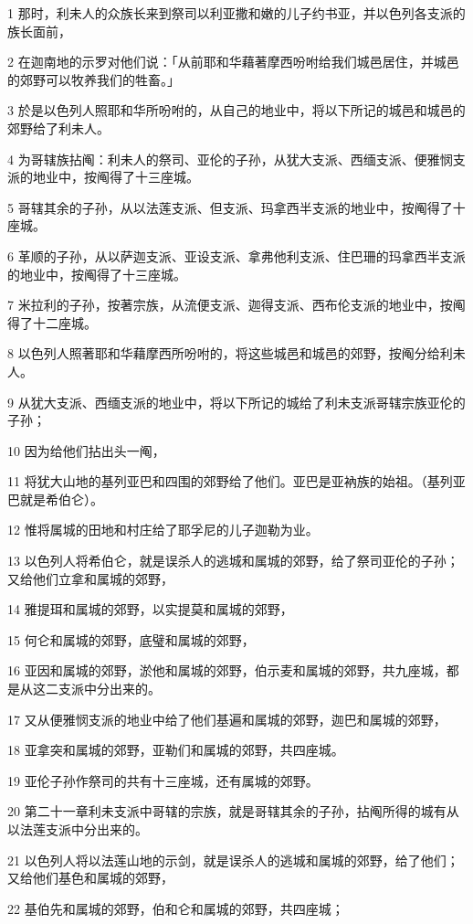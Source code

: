 \par 1 那时，利未人的众族长来到祭司以利亚撒和嫩的儿子约书亚，并以色列各支派的族长面前，
\par 2 在迦南地的示罗对他们说：「从前耶和华藉著摩西吩咐给我们城邑居住，并城邑的郊野可以牧养我们的牲畜。」
\par 3 於是以色列人照耶和华所吩咐的，从自己的地业中，将以下所记的城邑和城邑的郊野给了利未人。
\par 4 为哥辖族拈阄：利未人的祭司、亚伦的子孙，从犹大支派、西缅支派、便雅悯支派的地业中，按阄得了十三座城。
\par 5 哥辖其余的子孙，从以法莲支派、但支派、玛拿西半支派的地业中，按阄得了十座城。
\par 6 革顺的子孙，从以萨迦支派、亚设支派、拿弗他利支派、住巴珊的玛拿西半支派的地业中，按阄得了十三座城。
\par 7 米拉利的子孙，按著宗族，从流便支派、迦得支派、西布伦支派的地业中，按阄得了十二座城。
\par 8 以色列人照著耶和华藉摩西所吩咐的，将这些城邑和城邑的郊野，按阄分给利未人。
\par 9 从犹大支派、西缅支派的地业中，将以下所记的城给了利未支派哥辖宗族亚伦的子孙；
\par 10 因为给他们拈出头一阄，
\par 11 将犹大山地的基列亚巴和四围的郊野给了他们。亚巴是亚衲族的始祖。（基列亚巴就是希伯仑）。
\par 12 惟将属城的田地和村庄给了耶孚尼的儿子迦勒为业。
\par 13 以色列人将希伯仑，就是误杀人的逃城和属城的郊野，给了祭司亚伦的子孙；又给他们立拿和属城的郊野，
\par 14 雅提珥和属城的郊野，以实提莫和属城的郊野，
\par 15 何仑和属城的郊野，底璧和属城的郊野，
\par 16 亚因和属城的郊野，淤他和属城的郊野，伯示麦和属城的郊野，共九座城，都是从这二支派中分出来的。
\par 17 又从便雅悯支派的地业中给了他们基遍和属城的郊野，迦巴和属城的郊野，
\par 18 亚拿突和属城的郊野，亚勒们和属城的郊野，共四座城。
\par 19 亚伦子孙作祭司的共有十三座城，还有属城的郊野。
\par 20 第二十一章利未支派中哥辖的宗族，就是哥辖其余的子孙，拈阄所得的城有从以法莲支派中分出来的。
\par 21 以色列人将以法莲山地的示剑，就是误杀人的逃城和属城的郊野，给了他们；又给他们基色和属城的郊野，
\par 22 基伯先和属城的郊野，伯和仑和属城的郊野，共四座城；

